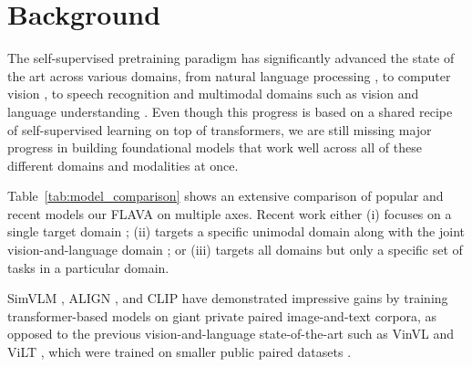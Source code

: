 \documentclass[10pt,twocolumn,letterpaper]{article}
\newcommand{\FLAVA}{FLAVA\xspace}
\begin{document}
\section{Background}

The self-supervised pretraining paradigm has significantly advanced the state of the art across various domains, from natural language processing \cite{radford2021learning,radford2018improving,devlin2018bert,liu2019roberta,lewis2019bart,dong2019unilm,raffel2019t5,bao2020unilm2,conneau2019xlm,conneau2020xlmr,chi2019cross,chi2021infoxlm,chi2021xlme,ma2021deltalm}, to computer vision \cite{dosovitskiy2020image,touvron2020training,bao2021beit, carion2020end, gabeur2020multi, le2019multimodal, yuan2021temporal,bertasius2021space, neimark2021video, girdhar2019video, arnab2021vivit}, to speech recognition \cite{baevski2020wav2vec, conneau2020unsupervised, zhang2020pushing, liu2021tera, hsu2021hubert} and multimodal domains such as vision and language understanding \cite{jia2021scaling,carion2020end,hu2021unit,hu2020iterative,tan2019LXMERTLC,su2019vl,li2021albef, zhou2020unified, chen2020uniter, li2020oscar, li2021unimo, singh2020we, lu2019vilbert, li2019visualbert, lu202012, gan2020villa, zhang2021vinvl, wang2021simvlm, huang2021soho, yu2020ernie}. Even though this progress is based on a shared recipe of self-supervised learning on top of transformers, we are still missing major progress in building foundational models \cite{bommasani2021opportunities} that work well across all of these different domains and modalities at once.

Table~\ref{tab:model_comparison} shows an extensive comparison of popular and recent models \wrt our \FLAVA on multiple axes. Recent work either (i) focuses on a single target domain \cite{zhang2021vinvl, kim2021vilt}; (ii) targets a specific unimodal domain along with the joint vision-and-language domain \cite{jia2021scaling, radford2021learning}; or (iii) targets all domains but only a specific set of tasks in a particular domain.

SimVLM \cite{wang2021simvlm}, ALIGN \cite{jia2021scaling}, and CLIP \cite{radford2021learning} have demonstrated impressive gains by training transformer-based models on giant private paired image-and-text corpora, as opposed to the previous vision-and-language state-of-the-art such as VinVL \cite{zhang2021vinvl} and ViLT \cite{kim2021vilt}, which were trained on smaller public paired datasets \cite{conceptual_captions, ordonez2011sbu, coco, chen2015microsoft,visual_genome}.
\end{document}
